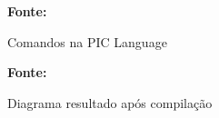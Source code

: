 \begin{figure}[ht!]
\centering

\caption{\textmd{Comandos na PIC Language}}
\label{fig:piclanguage}

\par\medskip\textbf{Fonte:} \cite{bentley} \par\medskip
\end{figure}

\begin{figure}[ht!]
\centering

\caption{\textmd{Diagrama resultado após compilação}}
\label{fig:piclanguageresultado}

\par\medskip\textbf{Fonte:} \cite{bentley} \par\medskip
\end{figure}
